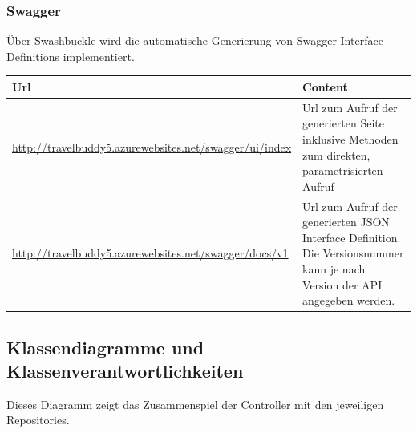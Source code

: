 \documentclass[a4paper,10pt,xetex]{article}
\begin{document}
\subsubsection[Swagger]{Swagger}
	\"Uber Swashbuckle wird die automatische Generierung von Swagger Interface Definitions implementiert. 

\begin{longtabu} to \textwidth { | l | l | }
	\hline
	\textbf{Url}  & \textbf{Content} \\
	\hline
	\endhead
	
		\url{http://travelbuddy5.azurewebsites.net/swagger/ui/index} &
		Url zum Aufruf der generierten Seite inklusive Methoden zum direkten, parametrisierten
			Aufruf\\\hline
		\url{http://travelbuddy5.azurewebsites.net/swagger/docs/v1} &
		Url zum Aufruf der generierten JSON Interface Definition. Die Versionsnummer kann je nach
			Version der API angegeben werden.\\\hline
\end{longtabu}

\bigskip


\bigskip

\clearpage
\bigskip

\subsection[Klassendiagramme und Klassenverantwortlichkeiten]{ Klassendiagramme und Klassenverantwortlichkeiten}

	Dieses Diagramm zeigt das Zusammenspiel der Controller mit den jeweiligen Repositories.


\bigskip
\end{document}

